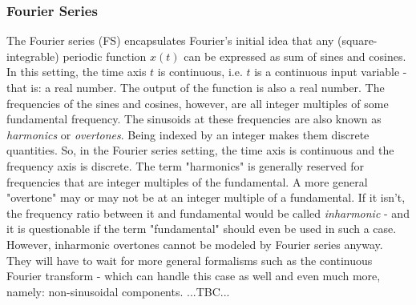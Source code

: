 \subsubsection{Fourier Series}
The Fourier series (FS) encapsulates Fourier's initial idea that any (square-integrable) periodic function $x(t)$ can be expressed as sum of sines and cosines. In this setting, the time axis $t$ is continuous, i.e. $t$ is a continuous input variable - that is: a real number. The output of the function is also a real number. The frequencies of the sines and cosines, however, are all integer multiples of some fundamental frequency. The sinusoids at these frequencies are also known as \emph{harmonics} or \emph{overtones}. Being indexed by an integer makes them discrete quantities. So, in the Fourier series setting, the time axis is continuous and the frequency axis is discrete. The term "harmonics" is generally reserved for frequencies that are integer multiples of the fundamental. A more general "overtone" may or may not be at an integer multiple of a fundamental. If it isn't, the frequency ratio between it and fundamental would be called \emph{inharmonic} - and it is questionable if the term "fundamental" should even be used in such a case. However, inharmonic overtones cannot be modeled by Fourier series anyway. They will have to wait for more general formalisms such as the continuous Fourier transform - which can handle this case as well and even much more, namely: non-sinusoidal components. ...TBC...









